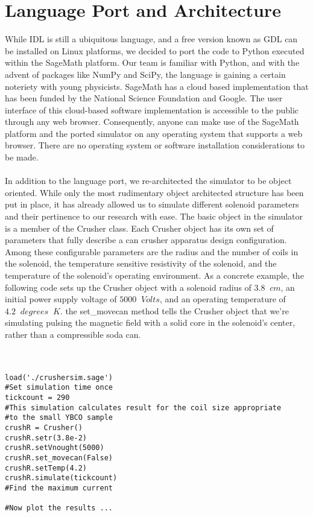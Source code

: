 \documentclass[prb,preprint]{revtex4-1}
\begin{document}
\section{Language Port and Architecture}
While IDL is still a ubiquitous language, and a free version known as GDL can be installed on Linux platforms, we decided to port the code to Python executed within the SageMath platform.  Our team is familiar with Python, and with the advent of packages like NumPy and SciPy, the language is gaining a certain noteriety with young physicists.  SageMath has a cloud based implementation that has been funded by the National Science Foundation and Google. The user interface of this cloud-based software implementation is accessible to the public through any web browser.  Consequently, anyone can make use of the SageMath platform and the ported simulator on any operating system that supports a web browser.  There are no operating system or software installation considerations to be made.
\\
\\
In addition to the language port, we re-architected the simulator to be object oriented.  While only the most rudimentary object architected structure has been put in place, it has already allowed us to simulate different solenoid parameters and their pertinence to our research with ease.  The basic object in the simulator is a member of the Crusher class.  Each Crusher object has its own set of parameters that fully describe a can crusher apparatus design configuration.  Among these configurable parameters  are the radius and the number of coils in the solenoid, the temperature sensitive resistivity of the solenoid, and the temperature of the solenoid's operating environment.  As a concrete example, the following code sets up the Crusher object with a solenoid radius of $3.8\;\;cm$, an initial power supply voltage of $5000\;\;Volts$, and an operating temperature of $4.2\;\;degrees\;\;K$.  the set\_movecan method tells the Crusher object that we're simulating pulsing the magnetic field with a solid core in the solenoid's center, rather than a compressible soda can.
\\\\\\
\lstset{language=Python}
\begin{lstlisting}[frame=single]
load('./crushersim.sage')
#Set simulation time once
tickcount = 290
#This simulation calculates result for the coil size appropriate
#to the small YBCO sample
crushR = Crusher()
crushR.setr(3.8e-2)
crushR.setVnought(5000)
crushR.set_movecan(False)
crushR.setTemp(4.2)
crushR.simulate(tickcount)
#Find the maximum current

#Now plot the results ...
\end{lstlisting}
\end{document}
